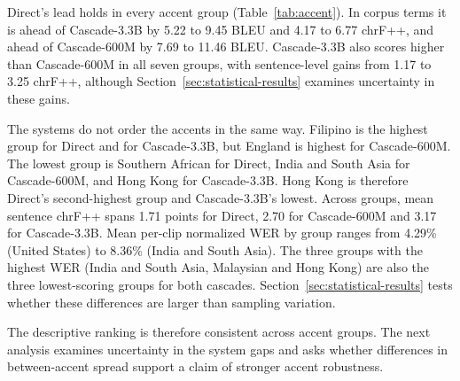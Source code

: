 Direct's lead holds in every accent group (Table~\ref{tab:accent}). In
corpus terms it is ahead of Cascade-3.3B by 5.22 to 9.45 BLEU and 4.17 to
6.77 chrF++, and ahead of Cascade-600M by 7.69 to 11.46 BLEU. Cascade-3.3B
also scores higher than Cascade-600M in all seven groups, with
sentence-level gains from 1.17 to 3.25 chrF++, although
Section~\ref{sec:statistical-results} examines uncertainty in these gains.

The systems do not order the accents in the same way. Filipino is the
highest group for Direct and for Cascade-3.3B, but England is highest for
Cascade-600M. The lowest group is Southern African for Direct, India and
South Asia for Cascade-600M, and Hong Kong for Cascade-3.3B. Hong Kong is
therefore Direct's second-highest group and Cascade-3.3B's lowest. Across
groups, mean sentence chrF++ spans 1.71 points for Direct, 2.70 for
Cascade-600M and 3.17 for Cascade-3.3B. Mean per-clip normalized WER by
group ranges from 4.29\% (United States) to 8.36\% (India and South Asia).
The three groups with the highest WER (India and South Asia, Malaysian and Hong Kong)
are also the three lowest-scoring groups for both cascades. Section~\ref{sec:statistical-results}
tests whether these differences are larger than sampling variation.

The descriptive ranking is therefore consistent across accent groups. The next
analysis examines uncertainty in the system gaps and asks whether differences
in between-accent spread support a claim of stronger accent robustness.
